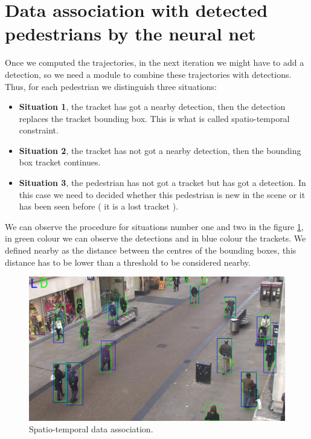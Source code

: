 \section{Data association with detected pedestrians by the neural net}

Once we computed the trajectories, in the next iteration we might have to add a detection, so we need a module to combine these trajectories with detections. Thus, for each pedestrian we distinguish three situations:

\begin{itemize}



\item \textbf{Situation 1}, the tracket has got a nearby detection, then the detection replaces the tracket bounding box. This is what is called spatio-temporal constraint.

\item \textbf{Situation 2}, the tracket has not got a nearby detection, then the bounding box tracket continues.

\item \textbf{Situation 3}, the pedestrian has not got a tracket but has got a detection. In this case we need to decided whether this pedestrian is new in the scene or it has been seen before ( it is a lost tracket ).

\end{itemize}

We can observe the procedure for situations number one and two in the figure \ref{data1}, in green colour we can observe the detections and in blue colour the trackets. We defined nearby as the distance between the centres of the bounding boxes, this distance has to be lower than a threshold to be considered nearby. 

\begin{figure}[hptb]
\centering         
\includegraphics[width=12cm]{lucasKanade/dataAssociation.jpg}
\caption{Spatio-temporal data association.} \label{data1}
\end{figure}


